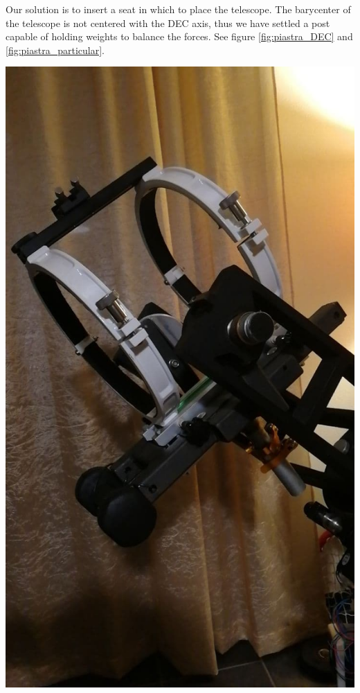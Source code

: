 \documentclass{article}
\begin{document}
\begin{multicols}{2}
        Our solution is to insert a seat in which to place the telescope.
        The barycenter of the telescope is not centered with the DEC axis, thus we have settled a post capable of holding weights to balance the forces.
        See figure \ref{fig:piastra_DEC} and \ref{fig:piastra_particular}.
        \\
        \begin{minipage}{0.25\textwidth}
            \centering
            \includegraphics[scale=0.5]{DEC_sede.jpg}

\end{minipage}
\end{multicols}
\end{document}
